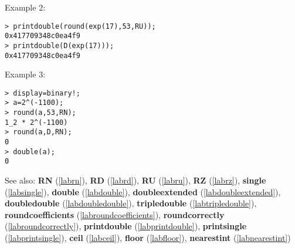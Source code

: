 \noindent Example 2: 
\begin{center}\begin{minipage}{15cm}\begin{Verbatim}[frame=single]
> printdouble(round(exp(17),53,RU));
0x417709348c0ea4f9
> printdouble(D(exp(17)));
0x417709348c0ea4f9
\end{Verbatim}
\end{minipage}\end{center}
\noindent Example 3: 
\begin{center}\begin{minipage}{15cm}\begin{Verbatim}[frame=single]
> display=binary!;
> a=2^(-1100);
> round(a,53,RN);
1_2 * 2^(-1100)
> round(a,D,RN);
0
> double(a);
0
\end{Verbatim}
\end{minipage}\end{center}
See also: \textbf{RN} (\ref{labrn}), \textbf{RD} (\ref{labrd}), \textbf{RU} (\ref{labru}), \textbf{RZ} (\ref{labrz}), \textbf{single} (\ref{labsingle}), \textbf{double} (\ref{labdouble}), \textbf{doubleextended} (\ref{labdoubleextended}), \textbf{doubledouble} (\ref{labdoubledouble}), \textbf{tripledouble} (\ref{labtripledouble}), \textbf{roundcoefficients} (\ref{labroundcoefficients}), \textbf{roundcorrectly} (\ref{labroundcorrectly}), \textbf{printdouble} (\ref{labprintdouble}), \textbf{printsingle} (\ref{labprintsingle}), \textbf{ceil} (\ref{labceil}), \textbf{floor} (\ref{labfloor}), \textbf{nearestint} (\ref{labnearestint})
